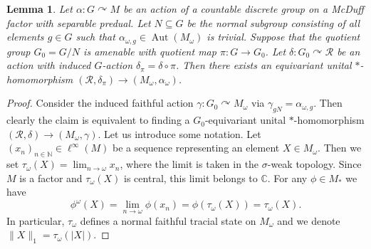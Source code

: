 \documentclass[11pt,a4paper]{article}
\newtheorem{lemma}[theorem]{Lemma}
\theoremstyle{definition}
\theoremstyle{remark}
\numberwithin{equation}{section}
\numberwithin{theorem}{section}
\newcommand{\N}{\mathbb{N}}
\newcommand{\C}{\mathbb{C}}
\newcommand{\acts}{\curvearrowright}
\begin{document}
\begin{lemma}\label{lem:approx-central-embeddings}
Let $\alpha\colon G \acts M$ be an action of a countable discrete group on a McDuff factor with separable predual.
Let $N\subseteq G$ be the normal subgroup consisting of all elements $g\in G$ such that $\alpha_{\omega,g} \in\operatorname{Aut}(M_\omega)$ is trivial.
Suppose that the quotient group $G_0=G/N$ is amenable with quotient map $\pi: G\to G_0$.
Let $\delta: G_0\curvearrowright\mathcal R$ be an action with induced $G$-action $\delta_\pi=\delta\circ\pi$. 
Then there exists an equivariant unital $*$-homomorphism $(\mathcal R,\delta_\pi)\to (M_\omega,\alpha_\omega)$.
\end{lemma}
\begin{proof}
Consider the induced faithful action $\gamma: G_0\curvearrowright M_\omega$ via $\gamma_{gN}=\alpha_{\omega,g}$.
Then clearly the claim is equivalent to finding a $G_0$-equivariant unital $*$-homomorphism $(\mathcal R,\delta)\to (M_\omega,\gamma)$.
Let us introduce some notation.
Let $(x_n)_{n \in \N} \in \ell^\infty(M)$ be a sequence representing an element $X \in M_\omega$. Then we set $\tau_\omega(X) = \lim_{n \rightarrow \omega} x_n$,  where the limit is taken in the $\sigma$-weak topology.
Since $M$ is a factor and $\tau_\omega(X)$ is central, this limit belongs to $\C$. For any $\phi \in M_*$ we have
\[\phi^\omega(X) = \lim_{n \rightarrow \omega}\phi(x_n) = \phi(\tau_\omega(X)) = \tau_\omega(X).\]
In particular, $\tau_\omega$ defines a normal faithful tracial state on $M_\omega$ and we denote $\|X\|_1 = \tau_\omega(|X|)$.


\end{proof}
\end{document}

